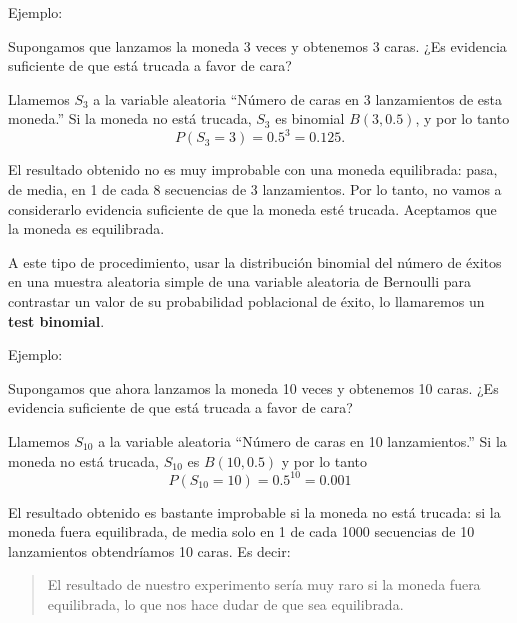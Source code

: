 \documentclass[
  spanish,
  letterpaper,
  DIV=11,
  numbers=noendperiod]{scrreprt}
\begin{document}
Ejemplo:

Supongamos que lanzamos la moneda 3 veces y obtenemos 3 caras. ¿Es
evidencia suficiente de que está trucada a favor de cara?

Llamemos \(S_3\) a la variable aleatoria ``Número de caras en 3
lanzamientos de esta moneda.'' Si la moneda no está trucada, \(S_3\) es
binomial \(B(3,0.5)\), y por lo tanto \[
P(S_3=3)=0.5^{3}=0.125.
\]

El resultado obtenido no es muy improbable con una moneda equilibrada:
pasa, de media, en 1 de cada 8 secuencias de 3 lanzamientos. Por lo
tanto, no vamos a considerarlo evidencia suficiente de que la moneda
esté trucada. Aceptamos que la moneda es equilibrada.

\begin{tcolorbox}[enhanced jigsaw, arc=.35mm, bottomrule=.15mm, bottomtitle=1mm, breakable, colback=white, colbacktitle=quarto-callout-tip-color!10!white, colframe=quarto-callout-tip-color-frame, coltitle=black, left=2mm, leftrule=.75mm, opacityback=0, opacitybacktitle=0.6, rightrule=.15mm, title=\textcolor{quarto-callout-tip-color}{\faLightbulb}\hspace{0.5em}{Tip}, titlerule=0mm, toprule=.15mm, toptitle=1mm]

A este tipo de procedimiento, usar la distribución binomial del número
de éxitos en una muestra aleatoria simple de una variable aleatoria de
Bernoulli para contrastar un valor de su probabilidad poblacional de
éxito, lo llamaremos un \textbf{test binomial}.

\end{tcolorbox}

Ejemplo:

Supongamos que ahora lanzamos la moneda 10 veces y obtenemos 10 caras.
¿Es evidencia suficiente de que está trucada a favor de cara?

Llamemos \(S_{10}\) a la variable aleatoria ``Número de caras en 10
lanzamientos.'' Si la moneda no está trucada, \(S_{10}\) es
\(B(10,0.5)\) y por lo tanto \[
P(S_{10}=10)=0.5^{10}=0.001
\]

El resultado obtenido es bastante improbable si la moneda no está
trucada: si la moneda fuera equilibrada, de media solo en 1 de cada 1000
secuencias de 10 lanzamientos obtendríamos 10 caras. Es decir:

\begin{quote}
El resultado de nuestro experimento sería muy raro si la moneda fuera
equilibrada, lo que nos hace dudar de que sea equilibrada.
\end{quote}
\end{document}
